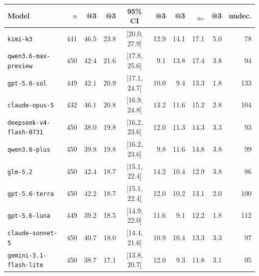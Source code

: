\begin{tabular}{lrrrcrrrrr}
\toprule
Model & $n$ & \pass{}@3 & \usable{}@3 & 95\% CI & \vuln{}@3 & \dfaeq{}@3 & \dfaeq{}$_{\text{dec}}$ & \exact{}@3 & undec. \\
\midrule
\texttt{kimi-k3} & 441 & 46.5 & 23.8 & [20.0, 27.9] & 12.9 & 14.1 & 17.1 & 5.0 & 78 \\
\texttt{qwen3.6-max-preview} & 450 & 42.4 & 21.6 & [17.8, 25.6] & 9.1 & 13.8 & 17.4 & 3.8 & 94 \\
\texttt{gpt-5.6-sol} & 449 & 42.1 & 20.9 & [17.1, 24.7] & 10.0 & 9.4 & 13.3 & 1.8 & 133 \\
\texttt{claude-opus-5} & 432 & 46.1 & 20.8 & [16.9, 24.8] & 13.2 & 11.6 & 15.2 & 2.8 & 104 \\
\texttt{deepseek-v4-flash-0731} & 450 & 38.0 & 19.8 & [16.2, 23.6] & 12.0 & 11.3 & 14.3 & 3.3 & 93 \\
\texttt{qwen3.6-plus} & 450 & 39.8 & 19.8 & [16.2, 23.6] & 9.8 & 11.6 & 14.8 & 3.8 & 99 \\
\texttt{glm-5.2} & 450 & 42.4 & 18.7 & [15.1, 22.4] & 14.2 & 10.4 & 12.9 & 3.8 & 86 \\
\texttt{gpt-5.6-terra} & 450 & 42.2 & 18.7 & [15.1, 22.4] & 12.0 & 10.2 & 13.1 & 2.0 & 100 \\
\texttt{gpt-5.6-luna} & 449 & 39.2 & 18.5 & [14.9, 22.0] & 11.6 & 9.1 & 12.2 & 1.8 & 112 \\
\texttt{claude-sonnet-5} & 450 & 40.7 & 18.0 & [14.4, 21.6] & 10.9 & 10.4 & 13.3 & 3.3 & 97 \\
\texttt{gemini-3.1-flash-lite} & 450 & 38.7 & 17.1 & [13.8, 20.7] & 12.0 & 9.3 & 11.8 & 3.1 & 95 \\
\bottomrule
\end{tabular}
